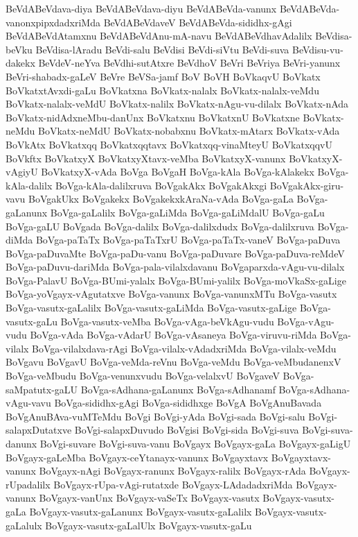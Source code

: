{BeVdABeVdava-diya
BeVdABeVdava-diyu
BeVdABeVda-vanunx
BeVdABeVda-vanonxpipxdadxriMda
BeVdABeVdaveV
BeVdABeVda-sididhx-gAgi
BeVdABeVdAtamxnu
BeVdABeVdAnu-mA-navu
BeVdABeVdhavAdalilx
BeVdisa-beVku
BeVdisa-lAradu
BeVdi-salu
BeVdisi
BeVdi-siVtu
BeVdi-suva
BeVdisu-vu-dakekx
BeVdeV-neYva
BeVdhi-sutAtxre
BeVdhoV
BeVri
BeVriya
BeVri-yanunx
BeVri-shabadx-gaLeV
BeVre
BeVSa-jamf
BoV
BoVH
BoVkaqvU
BoVkatx
BoVkatxtAvxdi-gaLu
BoVkatxna
BoVkatx-nalalx
BoVkatx-nalalx-veMdu
BoVkatx-nalalx-veMdU
BoVkatx-nalilx
BoVkatx-nAgu-vu-dilalx
BoVkatx-nAda
BoVkatx-nidAdxneMbu-danUnx
BoVkatxnu
BoVkatxnU
BoVkatxne
BoVkatx-neMdu
BoVkatx-neMdU
BoVkatx-nobabxnu
BoVkatx-mAtarx
BoVkatx-vAda
BoVkAtx
BoVkatxqq
BoVkatxqqtavx
BoVkatxqq-vinaMteyU
BoVkatxqqvU
BoVkftx
BoVkatxyX
BoVkatxyXtavx-veMba
BoVkatxyX-vanunx
BoVkatxyX-vAgiyU
BoVkatxyX-vAda
BoVga
BoVgaH
BoVga-kAla
BoVga-kAlakekx
BoVga-kAla-dalilx
BoVga-kAla-dalilxruva
BoVgakAkx
BoVgakAkxgi
BoVgakAkx-giru-vavu
BoVgakUkx
BoVgakekx
BoVgakekxkAraNa-vAda
BoVga-gaLa
BoVga-gaLanunx
BoVga-gaLalilx
BoVga-gaLiMda
BoVga-gaLiMdalU
BoVga-gaLu
BoVga-gaLU
BoVgada
BoVga-dalilx
BoVga-dalilxdudx
BoVga-dalilxruva
BoVga-diMda
BoVga-paTaTx
BoVga-paTaTxrU
BoVga-paTaTx-vaneV
BoVga-paDuva
BoVga-paDuvaMte
BoVga-paDu-vanu
BoVga-paDuvare
BoVga-paDuva-reMdeV
BoVga-paDuvu-dariMda
BoVga-pala-vilalxdavanu
BoVgaparxda-vAgu-vu-dilalx
BoVga-PalavU
BoVga-BUmi-yalalx
BoVga-BUmi-yalilx
BoVga-moVkaSx-gaLige
BoVga-yoVgayx-vAgutatxve
BoVga-vanunx
BoVga-vanunxMTu
BoVga-vasutx
BoVga-vasutx-gaLalilx
BoVga-vasutx-gaLiMda
BoVga-vasutx-gaLige
BoVga-vasutx-gaLu
BoVga-vasutx-veMba
BoVga-vAga-beVkAgu-vudu
BoVga-vAgu-vudu
BoVga-vAda
BoVga-vAdarU
BoVga-vAsaneya
BoVga-viruvu-riMda
BoVga-vilalx
BoVga-vilalxdava-rAgi
BoVga-vilalx-vAdadxriMda
BoVga-vilalx-veMdu
BoVgavu
BoVgavU
BoVga-veMda-reVnu
BoVga-veMdu
BoVga-veMbudanenxV
BoVga-veMbudu
BoVga-venunxvudu
BoVga-velalxvU
BoVgaveV
BoVga-saMpatutx-gaLU
BoVga-sAdhana-gaLanunx
BoVga-sAdhanamf
BoVga-sAdhana-vAgu-vavu
BoVga-sididhx-gAgi
BoVga-sididhxge
BoVgA
BoVgAnuBavada
BoVgAnuBAva-vuMTeMdu
BoVgi
BoVgi-yAda
BoVgi-sada
BoVgi-salu
BoVgi-salapxDutatxve
BoVgi-salapxDuvudo
BoVgisi
BoVgi-sida
BoVgi-suva
BoVgi-suva-danunx
BoVgi-suvare
BoVgi-suva-vanu
BoVgayx
BoVgayx-gaLa
BoVgayx-gaLigU
BoVgayx-gaLeMba
BoVgayx-ceYtanayx-vanunx
BoVgayxtavx
BoVgayxtavx-vanunx
BoVgayx-nAgi
BoVgayx-ranunx
BoVgayx-ralilx
BoVgayx-rAda
BoVgayx-rUpadalilx
BoVgayx-rUpa-vAgi-rutatxde
BoVgayx-LAdadadxriMda
BoVgayx-vanunx
BoVgayx-vanUnx
BoVgayx-vaSeTx
BoVgayx-vasutx
BoVgayx-vasutx-gaLa
BoVgayx-vasutx-gaLanunx
BoVgayx-vasutx-gaLalilx
BoVgayx-vasutx-gaLalulx
BoVgayx-vasutx-gaLalUlx
BoVgayx-vasutx-gaLu
}
